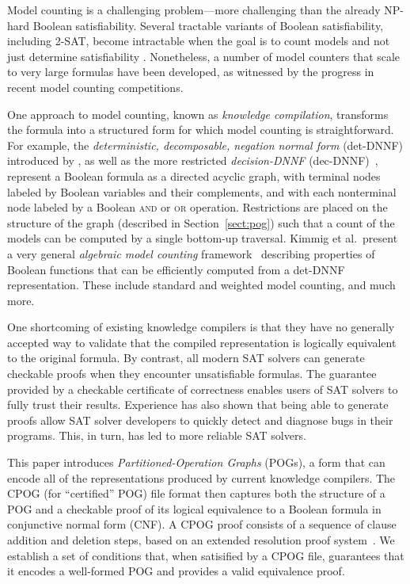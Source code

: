 \documentclass[twoside,11pt]{article}
\begin{document}
Model counting is a challenging problem---more challenging than the
already NP-hard Boolean satisfiability.  Several
tractable variants of Boolean satisfiability, including 2-SAT, become
intractable when the goal is to count models and not just determine
satisfiability \cite{valiant:siam:1979}.  Nonetheless, a number of
model counters that scale to very large formulas have been developed, as
witnessed by the progress in recent model counting competitions.

One approach to model counting, known as \emph{knowledge compilation},
transforms the formula into a structured form for which model counting
is straightforward.  For example, the \emph{deterministic, decomposable, negation normal form}
(det-DNNF) introduced by
, as well as the more restricted
\emph{decision-DNNF} (dec-DNNF)~\cite{huang:jair:2007,oztok:cp:2014},
represent a
Boolean formula as a directed acyclic graph, with terminal nodes
labeled by Boolean variables and their complements, and with each
nonterminal node labeled by a Boolean \textsc{and} or \textsc{or} operation.  Restrictions
are placed on the structure of the graph (described in Section~\ref{sect:pog}) such that a count of the
models can be computed by a single bottom-up traversal.
Kimmig et al.\ present a very general {\em
  algebraic model counting} framework~\cite{kimmig:jal:2017} describing
properties of Boolean functions that can be efficiently computed from
a det-DNNF representation.  These include standard and weighted model
counting, and much more.

One shortcoming of existing knowledge compilers is that they have no
generally accepted
way to validate that
the compiled representation is logically equivalent to the original
formula.  By contrast, all modern SAT solvers can generate
checkable proofs when they encounter unsatisfiable formulas.  The
guarantee provided by a checkable certificate of correctness enables
users of SAT solvers to fully trust their results.  Experience has also
shown that being able to generate proofs allow SAT solver developers to quickly
detect and diagnose bugs in their programs. This, in turn, has led
to more reliable SAT solvers.

This paper introduces \emph{Partitioned-Operation Graphs} (POGs),
a form that can encode all of the representations produced by current knowledge
compilers. The CPOG (for ``certified'' POG) file format then
captures both the structure of a POG
and a checkable proof of its logical equivalence to a Boolean formula in
conjunctive normal form (CNF).  A CPOG
proof consists of a sequence of clause addition and deletion steps,
based on an extended resolution proof system~\cite{Tseitin:1983}.
We establish a set of conditions that, when satisified by a CPOG file, guarantees that it
encodes a well-formed POG and provides a valid equivalence proof.
\end{document}
